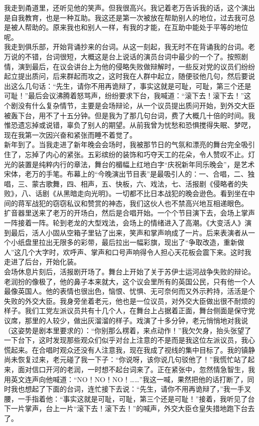 我走到甬道里，还听见他的笑声。但我很高兴。我记着老万告诉我的话，这个演出是自我教育，也是一种互助。我这还是第一次被放在帮助别人的地位，过去我可总是被人帮助的。原来我也和别人一样，有我的才能，在互助中能处于平等的地位呢。\\

我走到俱乐部，开始背诵抄来的台词。从这一刻起，我无时不在背诵我的台词。老万说的不错，台词很短，大概这是台上说话的演员台词中最少的一个了。按照剧情，演到最后，在议会讲台上为他的侵略失败做辩解时，一些反对党的议员们纷纷起立提出质问，后来群起而攻之，这时我在人群中起立，随便驳他几句，然后要说出这么几句话：“先生，请你不用再诡辩了，事实这就是可耻，可耻，第三个还是可耻！”最后会议沸腾着怒骂声，纷纷要求下台，我喊道：“滚下去！滚下去！”这个剧没有什么复杂情节，主要是会场辩论，从一个议员提出质问开始，到外交大臣被轰下台，用不了十五分钟。但是我为了那几句台词，费了大概几十倍的时间。我惟恐遗忘掉或说错，辜负了别人的期望。从前我曾为忧愁和恐惧搅得失眠、梦呓，现在我第一次因兴奋和紧张而睡不着觉了。\\

新年到了。当我走进了新年晚会会场时，我被那节日的气氛和漂亮的舞台完全吸引住了，忘掉了内心的紧张。五彩缤纷的装饰和巧夺天工的花朵，令人赞叹不止。灯光的装置是纯粹内行的章法，舞台的楣幅上红地白字“庆祝新年同乐晚会”，是艺术宋体，老万的手笔。布幕上的“今晚演出节目表”是最吸引人的：一、合唱，二、独唱，三、蒙古歌舞，四、相声，五、快板，六、戏法，七、活报剧《侵略者的失败》，八、话剧《从黑暗走向光明》。一切都不比日本战犯的晚会逊色。看到坐在中间的蒋军战犯的窃窃私议和赞赏的神态，我们这伙人也不禁高兴地互相递眼色。\\

扩音器里送来了老万的开场白，然后是合唱开始。一个个节目演下去，会场上掌声一阵接着一阵。轮到老龙的大型戏法，会场上的情绪进入了高潮。《大变活人》演到最后，活人小固从空箱子里钻了出来，笑声和掌声响成了一片。后来表演者从一个小纸盘里拉出无限多的彩带，最后拉出一幅彩旗，现出了“争取改造，重新做人”这几个大字时，欢呼声、掌声和口号声响得令人担心天花板会震下来。这时我走进了后台，开始化装。\\

会场休息片刻后，活报剧开场了。舞台上开始了关于苏伊士运河战争失败的辩论。老润扮的像极了，他的鼻子本来就大，这个议会里所有的英国公民，只有他一个人最像英国人。他的表情也很出色，恼恨、忧惧、无可奈何而又外示矜持，活活是个失败的外交大臣。我身旁坐着老元，他也是一位议员，对外交大臣做出很不耐烦的样子。我们工党左派议员共有十几个人，在舞台上占据着正面，舞台侧面是保守党议席，那里的人较少，做出灰溜溜的样子。戏演了十多分钟，老元悄悄地对我说（这姿势是剧本里要求的）：“你别那么楞着，来点动作！”我欠欠身，抬头张望了一下台下，这时发现那些观众们似乎对台上注意的不是而是我这位左派议员，我心慌起来。在合唱时观众还没有人注意我，现在我成了视线的集中目标了。我的镇静尚未恢复过来，老元碰了我一下子：“你说呀，该你说几句驳他了！”我慌忙站了起来，面对信口开河的老润，一时想不起台词来了。正在紧张中，忽然情急智生，我用英文连声向他喊道：“NO！NO！NO！……”我这一喊，果然把他的话打断了，同时我也想起了下面的台词，连忙接下去说：“先生，请你不用再诡辩了，”我一手叉腰，一手指着他：“事实这就是可耻，可耻，第三个还是可耻！”接着，我听见了台下一片掌声，台上一片“滚下去！滚下去！”的喊声，外交大臣仓皇失措地跑下台去了。\\

